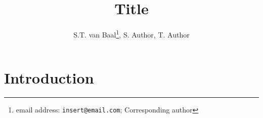 \documentclass[12pt, letterpaper]{article}
\title{Title}
\author{S.T. van Baal\thanks{email address: \texttt{insert@email.com}; Corresponding author}, S. Author, T. Author}
\date{}
\newcommand{\beginsupplement}{%
        \setcounter{table}{0}
        \renewcommand{\thetable}{S\arabic{table}}%
        \setcounter{figure}{0}
        \renewcommand{\thefigure}{S\arabic{figure}}%
     }
\begin{document}
\maketitle

\begin{abstract}
    \noindent \lipsum[1]
\end{abstract}

\section{Introduction}

\lipsum[2]

\printbibliography

\beginsupplement
\end{document}
